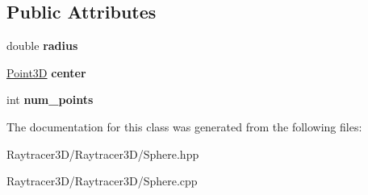 \subsection*{Public Attributes}
\begin{DoxyCompactItemize}
\item 
\hypertarget{class_sphere_a45d6c6c870fac7c2a885ad2e226334ad}{}\label{class_sphere_a45d6c6c870fac7c2a885ad2e226334ad} 
double {\bfseries radius}
\item 
\hypertarget{class_sphere_a774cb90ed1b46592e63a112338f1cc58}{}\label{class_sphere_a774cb90ed1b46592e63a112338f1cc58} 
\hyperlink{class_point3_d}{Point3D} {\bfseries center}
\item 
\hypertarget{class_sphere_a50d3abf7b35058bae9bcbba998a82943}{}\label{class_sphere_a50d3abf7b35058bae9bcbba998a82943} 
int {\bfseries num\+\_\+points}
\end{DoxyCompactItemize}


The documentation for this class was generated from the following files\+:\begin{DoxyCompactItemize}
\item 
Raytracer3\+D/\+Raytracer3\+D/Sphere.\+hpp\item 
Raytracer3\+D/\+Raytracer3\+D/Sphere.\+cpp\end{DoxyCompactItemize}
